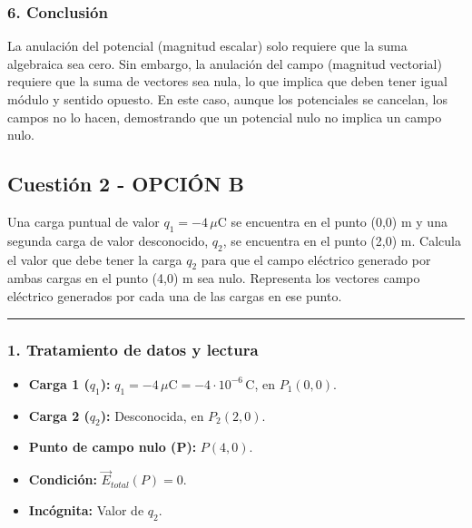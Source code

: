\subsubsection*{6. Conclusión}
\begin{cajaconclusion}
La anulación del potencial (magnitud escalar) solo requiere que la suma algebraica sea cero. Sin embargo, la anulación del campo (magnitud vectorial) requiere que la suma de vectores sea nula, lo que implica que deben tener igual módulo y sentido opuesto. En este caso, aunque los potenciales se cancelan, los campos no lo hacen, demostrando que un potencial nulo no implica un campo nulo.
\end{cajaconclusion}
\newpage

\subsection{Cuestión 2 - OPCIÓN B}
\label{subsec:2B_2019_jun_ord}
\begin{cajaenunciado}
Una carga puntual de valor $q_{1}=-4\,\mu\text{C}$ se encuentra en el punto (0,0) m y una segunda carga de valor desconocido, $q_{2}$, se encuentra en el punto (2,0) m. Calcula el valor que debe tener la carga $q_{2}$ para que el campo eléctrico generado por ambas cargas en el punto (4,0) m sea nulo. Representa los vectores campo eléctrico generados por cada una de las cargas en ese punto.
\end{cajaenunciado}
\hrule
\subsubsection*{1. Tratamiento de datos y lectura}
\begin{itemize}
    \item \textbf{Carga 1 ($q_1$):} $q_1 = -4\,\mu\text{C} = -4\cdot10^{-6}\,\text{C}$, en $P_1(0,0)$.
    \item \textbf{Carga 2 ($q_2$):} Desconocida, en $P_2(2,0)$.
    \item \textbf{Punto de campo nulo (P):} $P(4,0)$.
    \item \textbf{Condición:} $\vec{E}_{total}(P)=0$.
    \item \textbf{Incógnita:} Valor de $q_2$.
\end{itemize}
